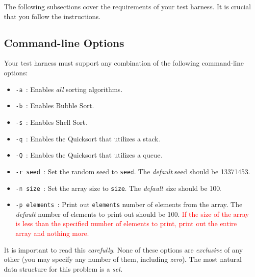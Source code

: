 \documentclass[11pt]{article}
\begin{document}
\noindent The following subsections cover the requirements of your test harness.
It is crucial that you follow the instructions.

\subsection{Command-line Options}

Your test harness must support any combination of the following
command-line options:

\begin{itemize}
  \item \texttt{-a}\ : Enables \emph{all} sorting algorithms.
  \item \texttt{-b}\ : Enables Bubble Sort.
  \item \texttt{-s}\ : Enables Shell Sort.
  \item \texttt{-q}\ : Enables the Quicksort that utilizes a stack.
  \item \texttt{-Q}\ : Enables the Quicksort that utilizes a queue.
  \item \texttt{-r seed}\ : Set the random seed to \texttt{seed}.
    The \emph{default} seed should be 13371453.
  \item \texttt{-n size}\ : Set the array size to \texttt{size}. The
    \emph{default} size should be 100.
  \item \texttt{-p elements}\ : Print out \texttt{elements} number of
    elements from the array. The \emph{default} number of elements to
    print out should be 100. \textcolor{red}{If the size of the array is
      less than the specified number of elements to print, print out the
    entire array and nothing more.}
\end{itemize}

It is important to read this \emph{carefully}. None of these options are
\emph{exclusive} of any other (you may specify any number of them,
including \emph{zero}). The most natural data structure for this
problem is a \emph{set}.


\end{document}
